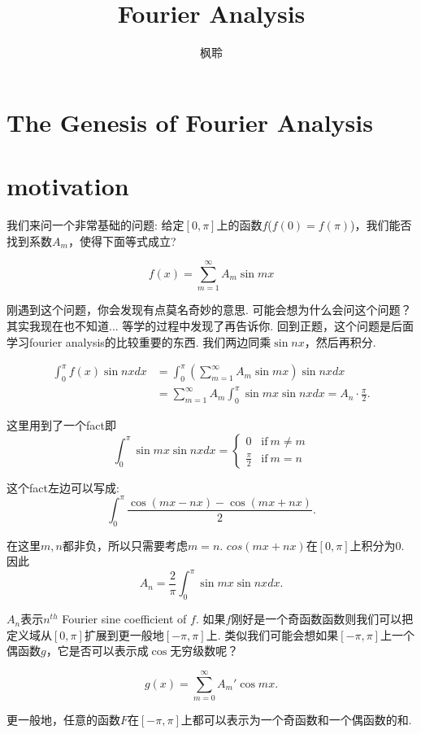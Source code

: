 \documentclass{article}
\begin{document}
\title{Fourier Analysis}
\author{枫聆}
\maketitle
\tableofcontents

\newpage
\section{The Genesis of Fourier Analysis}
\section{motivation}

我们来问一个非常基础的问题: 给定$[0,\pi]$上的函数$f$($f(0) = f(\pi)$)，我们能否找到系数$A_m$，使得下面等式成立?

$$
f(x) = \sum\limits_{m=1}^\infty A_m\sin mx
$$

刚遇到这个问题，你会发现有点莫名奇妙的意思. 可能会想为什么会问这个问题？其实我现在也不知道... 等学的过程中发现了再告诉你. 回到正题，这个问题是后面学习fourier analysis的比较重要的东西. 我们两边同乘$\sin nx$，然后再积分.

$$
\begin{aligned}
\int_0^\pi f(x)\sin nxdx &= \int_0^\pi \left(\sum\limits_{m=1}^\infty A_m \sin mx \right) \sin nx dx \\
&= \sum\limits_{m=1}^\infty A_m \int_0^\pi \sin mx \sin nx dx = A_n \cdot \frac{\pi}{2}.
\end{aligned}
$$

这里用到了一个fact即
$$
\int_0^\pi \sin mx \sin nx dx = \left \{
\begin{array}{lr}
0  & \text{if} \ m \neq m \\
\frac{\pi}{2} & \text{if} \ m = n
\end{array} \right.
$$

这个fact左边可以写成:
$$
\int_0^\pi \frac{\cos (mx-nx) - \cos (mx+nx)}{2}.
$$

在这里$m,n$都非负，所以只需要考虑$m=n$. $cos(mx+nx)$在$[0,\pi]$上积分为$0$. 因此
$$
A_n = \frac{2}{\pi} \int_0^\pi \sin mx \sin nx dx.
$$

$A_n$表示$n^{th}$ Fourier sine coefficient of $f$. 如果$f$刚好是一个奇函数函数则我们可以把定义域从$[0,\pi]$扩展到更一般地$[-\pi,\pi]$上. 类似我们可能会想如果$[-\pi,\pi]$上一个偶函数$g$，它是否可以表示成$\cos$无穷级数呢？

$$
g(x) = \sum\limits_{m=0}^{\infty} A_m' \cos mx.
$$

更一般地，任意的函数$F$在$[-\pi,\pi]$上都可以表示为一个奇函数和一个偶函数的和.
\end{document}
